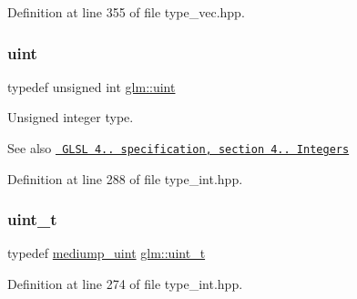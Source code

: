 Definition at line 355 of file type\+\_\+vec.\+hpp.

\mbox{\label{group__core__precision_ga4fd29415871152bfb5abd588334147c8}} 
\subsubsection{\texorpdfstring{uint}{uint}}
{\footnotesize\ttfamily typedef unsigned int \mbox{\hyperlink{group__core__precision_ga4fd29415871152bfb5abd588334147c8}{glm\+::uint}}}

Unsigned integer type.

\begin{DoxySeeAlso}{See also}
\href{http://www.opengl.org/registry/doc/GLSLangSpec.4.20.8.pdf}{\texttt{ G\+L\+SL 4.. specification, section 4.. Integers}} 
\end{DoxySeeAlso}


Definition at line 288 of file type\+\_\+int.\+hpp.

\mbox{\label{group__core__precision_ga5f2ae871c284c9d39ae8fdbb1305b566}} 
\subsubsection{\texorpdfstring{uint\_t}{uint\_t}}
{\footnotesize\ttfamily typedef \mbox{\hyperlink{group__core__precision_ga08ae38ad78ade3539fdd1d25052b8c51}{mediump\+\_\+uint}} \mbox{\hyperlink{group__core__precision_ga5f2ae871c284c9d39ae8fdbb1305b566}{glm\+::uint\+\_\+t}}}



Definition at line 274 of file type\+\_\+int.\+hpp.

